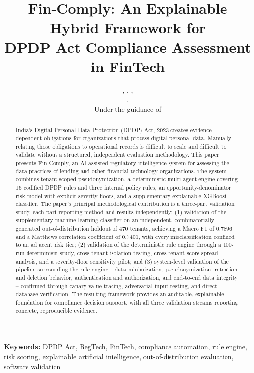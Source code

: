 \documentclass[11pt,a4paper]{article}
\title{\bfseries Fin-Comply: An Explainable Hybrid Framework for\\
DPDP Act Compliance Assessment in FinTech}
\author{
\placeholder{AUTHOR NAME 1}, \placeholder{AUTHOR NAME 2}, \placeholder{AUTHOR NAME 3}, \placeholder{AUTHOR NAME 4}\\[6pt]
\normalsize \placeholder{DEPARTMENT AND INSTITUTION}, \placeholder{CITY, COUNTRY}\\[4pt]
\normalsize Under the guidance of \placeholder{MENTOR NAME}\\[4pt]
\normalsize \placeholder{EMAIL ADDRESS}
}
\date{}
\newcommand{\system}{Fin-Comply}
\begin{document}
\maketitle

\begin{abstract}
India's Digital Personal Data Protection (DPDP) Act, 2023 creates evidence-dependent obligations for organizations that process digital personal data. Manually relating those obligations to operational records is difficult to scale and difficult to validate without a structured, independent evaluation methodology. This paper presents \system, an AI-assisted regulatory-intelligence system for assessing the data practices of lending and other financial-technology organizations. The system combines tenant-scoped pseudonymization, a deterministic multi-agent engine covering 16 codified DPDP rules and three internal policy rules, an opportunity-denominator risk model with explicit severity floors, and a supplementary explainable XGBoost classifier. The paper's principal methodological contribution is a three-part validation study, each part reporting method and results independently: (1) validation of the supplementary machine-learning classifier on an independent, combinatorially generated out-of-distribution holdout of 470 tenants, achieving a Macro F1 of 0.7896 and a Matthews correlation coefficient of 0.7401, with every misclassification confined to an adjacent risk tier; (2) validation of the deterministic rule engine through a 100-run determinism study, cross-tenant isolation testing, cross-tenant score-spread analysis, and a severity-floor sensitivity pilot; and (3) system-level validation of the pipeline surrounding the rule engine -- data minimization, pseudonymization, retention and deletion behavior, authentication and authorization, and end-to-end data integrity -- confirmed through canary-value tracing, adversarial input testing, and direct database verification. The resulting framework provides an auditable, explainable foundation for compliance decision support, with all three validation streams reporting concrete, reproducible evidence.
\end{abstract}

\noindent\textbf{Keywords:} DPDP Act, RegTech, FinTech, compliance automation, rule engine, risk scoring, explainable artificial intelligence, out-of-distribution evaluation, software validation
\end{document}
